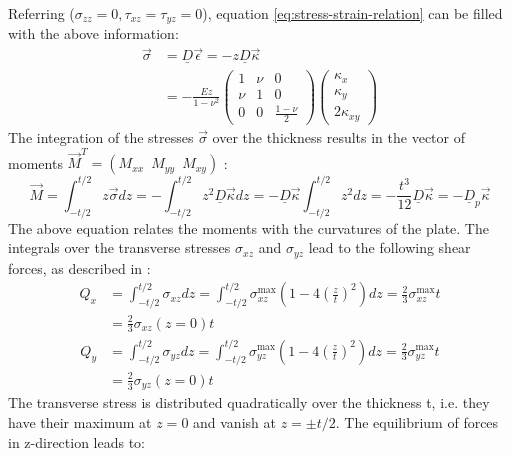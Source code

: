   Referring \cite{klein2013fem} ($\sigma_{zz} = 0, \tau_{xz} = \tau_{yz} = 0$), equation \ref{eq:stress-strain-relation} can be filled with the above information:
  \begin{align}\label{eq:sigma=-z*D*kappa}
  \vec{\sigma} &= \underline{D} \vec{\epsilon} = -z \underline{D} \vec{\kappa} \nonumber\\
               &= -\frac{E z}{1-\nu^2} \begin{pmatrix}
               1&\nu&0\\
               \nu&1&0\\
               0&0&\frac{1-\nu}{2}
               \end{pmatrix} \begin{pmatrix}
               \kappa_x\\\kappa_y\\2\kappa_{xy}
               \end{pmatrix}
  \end{align}
  The integration of the stresses $\vec{\sigma}$ over the thickness results in the vector of moments $\vec{M}^T = \left(M_{xx}\ \;M_{yy}\ \;M_{xy}\right)$ \cite{steinke2005finite}:
  \begin{equation}\label{eq:M=-Dp*kappa}
  \vec{M} = \int_{-t/2}^{t/2} z\vec{\sigma} dz = -\int_{-t/2}^{t/2} z^2 \underline{D} \vec{\kappa} dz = -\underline{D} \vec{\kappa} \int_{-t/2}^{t/2} z^2 dz = -\frac{t^3}{12} \underline{D} \vec{\kappa} = -\underline{D}_p \vec{\kappa}
  \end{equation}
  The above equation relates the moments with the curvatures of the plate. The integrals over the transverse stresses $\sigma_{xz}$ and $\sigma_{yz}$ lead to the following shear forces, as described in \cite{steinke2005finite}:
  \begin{align}
  Q_x &= \int_{-t/2}^{t/2}\sigma_{xz} dz = \int_{-t/2}^{t/2} \sigma_{xz}^{\max} \left(1-4\left(\frac{z}{t}\right)^2\right)dz = \frac{2}{3} \sigma_{xz}^{\max} t \nonumber\\
  &= \frac{2}{3} \sigma_{xz}(z=0) t
  \end{align}
  \begin{align}
  Q_y &= \int_{-t/2}^{t/2}\sigma_{yz} dz = \int_{-t/2}^{t/2} \sigma_{yz}^{\max} \left(1-4\left(\frac{z}{t}\right)^2\right)dz = \frac{2}{3} \sigma_{yz}^{\max} t \nonumber\\
  &= \frac{2}{3} \sigma_{yz}(z=0) t
  \end{align}
  The transverse stress is distributed quadratically over the thickness t, i.e. they have their maximum at $z=0$ and vanish at $z = \pm t/2$. The equilibrium of forces in z-direction leads to:
